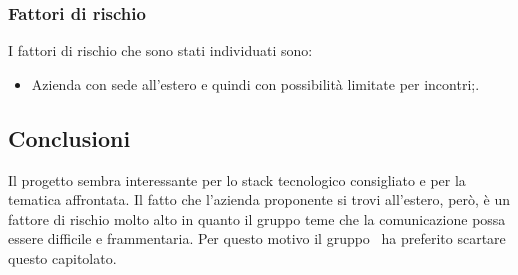\documentclass[../StudioDiFattibilita.tex]{subfiles}
\begin{document}
			\subsubsection{Fattori di rischio}
			I fattori di rischio che sono stati individuati sono:
			\begin{itemize}
				\item Azienda con sede all'estero e quindi con possibilità limitate per incontri;.
			\end{itemize}
			\subsection{Conclusioni}
			Il progetto sembra interessante per lo stack tecnologico consigliato e per la tematica affrontata. Il fatto che l'azienda proponente si trovi all'estero, però, è un fattore di rischio molto alto in quanto il gruppo teme che la comunicazione possa essere difficile e frammentaria. Per questo motivo il gruppo \kaleidoscode\ ha preferito scartare questo capitolato.
\end{document}
